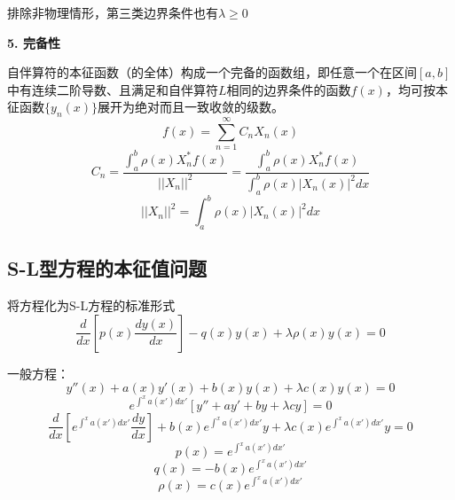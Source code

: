 排除非物理情形，第三类边界条件也有$\lambda\ge0$

\noindent\textbf{5. 完备性}

自伴算符的本征函数（的全体）构成一个完备的函数组，即任意一个在区间$[a,b]$中有连续二阶导数、且满足和自伴算符$L$相同的边界条件的函数$f(x)$，均可按本征函数$\{y_n(x)\}$展开为绝对而且一致收敛的级数。
$$f(x)=\sum_{n=1}^\infty C_nX_n(x)$$
$$C_n=\frac{\int_a^b\rho(x)X_n^*f(x)}{||X_n||^2}=\frac{\int_a^b\rho(x)X_n^*f(x)}{\int_a^b\rho(x)|X_n(x)|^2dx}$$
$$||X_n||^2=\int_a^b\rho(x)|X_n(x)|^2dx$$

\subsection{S-L型方程的本征值问题}
将方程化为S-L方程的标准形式
$$\frac{d}{dx}\left[p(x)\frac{dy(x)}{dx}\right]-q(x)y(x)+\lambda\rho(x)y(x)=0$$

一般方程：
$$y''(x)+a(x)y'(x)+b(x)y(x)+\lambda c(x)y(x)=0$$
$$e^{\int^x a(x')dx'}[y''+ay'+by+\lambda cy]=0$$
$$\frac{d}{dx}[e^{\int^x a(x')dx'}\frac{dy}{dx}]+b(x)e^{\int^x a(x')dx'}y+\lambda c(x)e^{\int^x a(x')dx'}y=0$$
$$p(x)=e^{\int^x a(x')dx'}$$
$$q(x)=-b(x)e^{\int^x a(x')dx'}$$
$$\rho(x)=c(x)e^{\int^x a(x')dx'}$$

